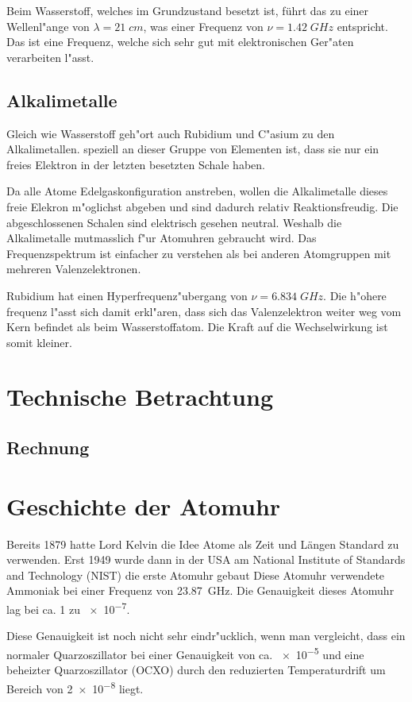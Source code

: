 \begin{refsection}
Beim Wasserstoff, welches im Grundzustand besetzt ist, führt das zu einer Wellenl"ange von $\lambda = 21\;cm$, was einer Frequenz von $\nu = 1.42\;GHz $ entspricht. Das ist eine Frequenz, welche sich sehr gut mit elektronischen Ger"aten verarbeiten l"asst. 

\subsection{Alkalimetalle}
Gleich wie Wasserstoff geh"ort auch Rubidium und C"asium zu den Alkalimetallen. speziell an dieser Gruppe von Elementen ist, dass sie nur ein freies Elektron in der letzten besetzten Schale haben. 

Da alle Atome Edelgaskonfiguration anstreben, wollen die Alkalimetalle dieses freie Elekron m"oglichst abgeben und sind dadurch relativ Reaktionsfreudig. 
Die abgeschlossenen Schalen sind elektrisch gesehen neutral. 
Weshalb die Alkalimetalle mutmasslich f"ur Atomuhren gebraucht wird. 
Das Frequenzspektrum ist einfacher zu verstehen als bei anderen Atomgruppen mit mehreren Valenzelektronen.

Rubidium hat einen Hyperfrequenz"ubergang von $\nu = 6.834\;GHz$. Die h"ohere frequenz l"asst sich damit erkl"aren, dass sich das Valenzelektron weiter weg vom Kern befindet als beim Wasserstoffatom. Die Kraft auf die Wechselwirkung ist somit kleiner. 

\section{Technische Betrachtung}

\subsection{Rechnung}

\section{Geschichte der Atomuhr}
\label{sec:gesch-der-atom}
Bereits 1879 hatte Lord Kelvin die Idee Atome als Zeit und Längen
Standard zu verwenden.  Erst 1949 wurde dann in der USA am National
Institute of Standards and Technology (NIST) die erste Atomuhr gebaut
\cite{ieee:nist} Diese Atomuhr verwendete Ammoniak bei einer Frequenz
von \SI{23.87}{\giga\hertz}.  Die Genauigkeit dieses Atomuhr lag bei
ca. 1 zu \num{e-7}.

Diese Genauigkeit ist noch nicht sehr eindr"ucklich, wenn man
vergleicht, dass ein normaler Quarzoszillator bei einer Genauigkeit
von ca. \num{e-5} und eine beheizter Quarzoszillator (OCXO) durch den
reduzierten Temperaturdrift um Bereich von \num{2e-8} liegt.


\end{refsection}
